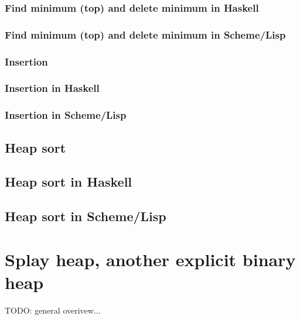 \documentclass{article}
\begin{document}
\subsubsection*{Find minimum (top) and delete minimum in Haskell}

\subsubsection*{Find minimum (top) and delete minimum in Scheme/Lisp}

\subsubsection{Insertion}

\subsubsection*{Insertion in Haskell}

\subsubsection*{Insertion in Scheme/Lisp}

\subsection{Heap sort}

\subsection*{Heap sort in Haskell}

\subsection*{Heap sort in Scheme/Lisp}



\section{Splay heap, another explicit binary heap}
\label{splayheap}

TODO: general overivew...
\end{document}
